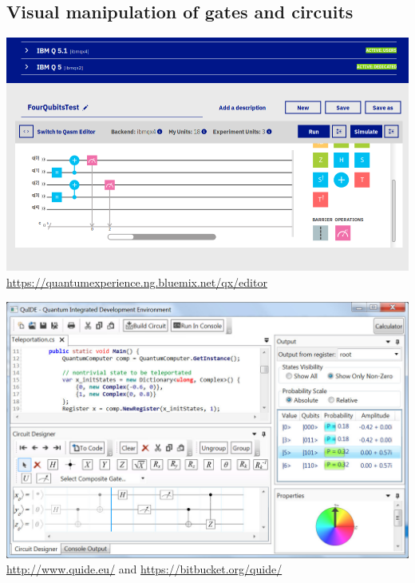 \documentclass{beamer}
\begin{document}
\subsection{Visual manipulation of gates and circuits}

\begin{frame}{\insertsection}{\insertsubsection}
    \begin{center}
        \includegraphics[height=0.65\textheight]{pics/ibm-q-experience-composer.png}
        \url{https://quantumexperience.ng.bluemix.net/qx/editor}
    \end{center}
\end{frame}

\begin{frame}{\insertsection}{\insertsubsection}
    \begin{center}
        \includegraphics[height=0.7\textheight]{pics/QuIDE_GUI.jpg}
        \url{http://www.quide.eu/} and \url{https://bitbucket.org/quide/}
\end{center}      
\end{frame}
\end{document}
